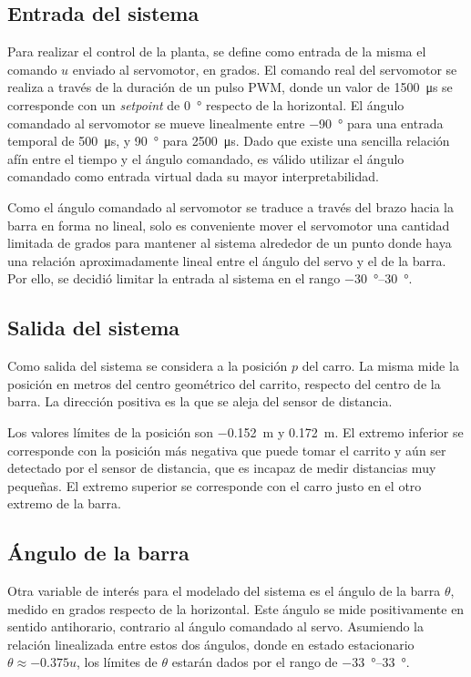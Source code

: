 \subsection{Entrada del sistema}

Para realizar el control de la planta, se define como entrada de la misma el comando $u$ enviado al servomotor, en grados. El comando real del servomotor se realiza a través de la duración de un pulso PWM, donde un valor de \qty{1500}{\us} se corresponde con un \emph{setpoint} de \qty{0}{\degree} respecto de la horizontal. El ángulo comandado al servomotor se mueve linealmente entre \qty{-90}{\degree} para una entrada temporal de \qty{500}{\us}, y \qty{90}{\degree} para \qty{2500}{\us}. Dado que existe una sencilla relación afín entre el tiempo y el ángulo comandado, es válido utilizar el ángulo comandado como entrada virtual dada su mayor interpretabilidad.

Como el ángulo comandado al servomotor se traduce a través del brazo hacia la barra en forma no lineal, solo es conveniente mover el servomotor una cantidad limitada de grados para mantener al sistema alrededor de un punto donde haya una relación aproximadamente lineal entre el ángulo del servo y el de la barra. Por ello, se decidió limitar la entrada al sistema en el rango \qtyrange{-30}{30}{\degree}.

\subsection{Salida del sistema}

Como salida del sistema se considera a la posición $p$ del carro. La misma mide la posición en metros del centro geométrico del carrito, respecto del centro de la barra. La dirección positiva es la que se aleja del sensor de distancia.

Los valores límites de la posición son \qty{-0.152}{\m} y \qty{0.172}{\m}. El extremo inferior se corresponde con la posición más negativa que puede tomar el carrito y aún ser detectado por el sensor de distancia, que es incapaz de medir distancias muy pequeñas. El extremo superior se corresponde con el carro justo en el otro extremo de la barra.

\subsection{Ángulo de la barra}

Otra variable de interés para el modelado del sistema es el ángulo de la barra $\theta$, medido en grados respecto de la horizontal. Este ángulo se mide positivamente en sentido antihorario, contrario al ángulo comandado al servo. Asumiendo la relación linealizada entre estos dos ángulos, donde en estado estacionario $\theta \approx -0.375 u$, los límites de $\theta$ estarán dados por el rango de \qtyrange{-33}{33}{\degree}.

